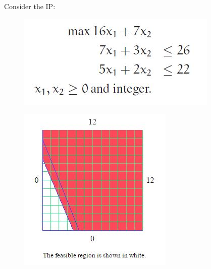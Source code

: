 \documentclass{beamer}
\begin{document}
\begin{frame}
Consider the IP:
\begin{figure}
\centering
\includegraphics[width=0.7\linewidth]{Exam14-Question}

\end{figure}
\end{frame}

\begin{frame}
	\begin{figure}
\centering
\includegraphics[width=0.7\linewidth]{Exam14-Main}
\end{figure}

\end{frame}

\end{document}
